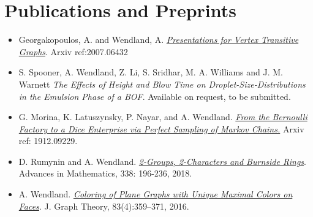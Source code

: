 \documentclass[a4paper,10pt]{article}
\begin{document}
\section{Publications and Preprints}
\begin{itemize}
	\item 
	Georgakopoulos, A. and Wendland, A. \emph{\href{https://arxiv.org/abs/2007.06432}{Presentations for Vertex Transitive Graphs}}. Arxiv ref:2007.06432
	\item 
	S. Spooner, A. Wendland, Z. Li, S. Sridhar, M. A. Williams and J. M. Warnett \emph{The Effects of Height and Blow Time on Droplet-Size-Distributions in the Emulsion Phase of a BOF}. Available on request, to be submitted.
	\item 
	G. Morina, K. Latuszynsky, P. Nayar, and A. Wendland. \emph{\href{https://arxiv.org/abs/1912.09229}{From the Bernoulli Factory to a Dice Enterprise via Perfect Sampling of Markov Chains.}} Arxiv ref: 1912.09229.
	\item
	D. Rumynin and A. Wendland. \href{https://www.sciencedirect.com/science/article/pii/S0001870818303347}{\emph{2-Groups, 2-Characters and Burnside Rings}}. Advances in Mathematics, 338: 196-236, 2018.
	\item
	A. Wendland. \href{http://onlinelibrary.wiley.com/doi/10.1002/jgt.22002/abstract}{\emph{Coloring of Plane Graphs with Unique Maximal Colors on Faces}}. J. Graph Theory, 83(4):359–371, 2016.
\end{itemize}
\end{document}
